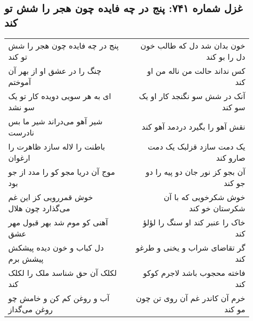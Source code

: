 \begin{center}
\section*{غزل شماره ۷۴۱: پنج در چه فایده چون هجر را شش تو کند}
\label{sec:0741}
\begin{longtable}{l p{0.5cm} r}
پنج در چه فایده چون هجر را شش تو کند
&&
خون بدان شد دل که طالب خون دل را بو کند
\\
چنگ را در عشق او از بهر آن آموختم
&&
کس نداند حالت من ناله من او کند
\\
ای به هر سویی دویده کار تو یک سو نشد
&&
آنک در شش سو نگنجد کار او یک سو کند
\\
شیر آهو می‌دراند شیر ما بس نادرست
&&
نقش آهو را بگیرد دردمد آهو کند
\\
باطنت را لاله سازد ظاهرت را ارغوان
&&
یک دمت سازد قزلبک یک دمت صارو کند
\\
موج آن دریا مجو کو را مدد از جو بود
&&
آن بجو کز نور جان دو پیه را دو جو کند
\\
خوش قمررویی کز این غم می‌گذارد چون هلال
&&
خوش شکرخویی که با آن شکرستان خو کند
\\
آهنی کو موم شد بهر قبول مهر عشق
&&
خاک را عنبر کند او سنگ را لؤلؤ کند
\\
دل کباب و خون دیده پیشکش پیشش برم
&&
گر تقاضای شراب و یخنی و طرغو کند
\\
لکلک آن حق شناسد ملک را لکلک کند
&&
فاخته محجوب باشد لاجرم کوکو کند
\\
آب و روغن کم کن و خامش چو روغن می‌گداز
&&
خرم آن کاندر غم آن روی تن چون مو کند
\\
\end{longtable}
\end{center}
